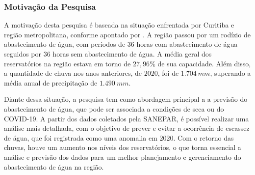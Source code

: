       
\subsubsection{Motiva\c c\~ao da Pesquisa} \label{subsubsec:motivacao}
 
 
A motivação desta pesquisa é baseada na situação enfrentada por Curitiba e região metropolitana, conforme apontado por . A região passou por um rodízio de abastecimento de água, com períodos de 36 horas com abastecimento de água seguidos por 36 horas sem abastecimento de água. A média geral dos reservatórios na região estava em torno de $27,96\%$ de sua capacidade. Além disso, a quantidade de chuva nos anos anteriores, de $2020$, foi de $1.704 \ mm$, superando a média anual de precipitação de $1.490 \ mm$.
 	
Diante dessa situação, a pesquisa tem como abordagem principal a a previsão do abastecimento de água, que pode ser associada a condições de seca ou do COVID-19. A partir dos dados coletados pela SANEPAR, é possível realizar uma análise mais detalhada, com o objetivo de prever e evitar a ocorrência de escassez de água, que foi registrada como uma anomalia em $2020$. Com o retorno das chuvas, houve um aumento nos níveis dos reservatórios, o que torna essencial a análise e previsão dos dados para um melhor planejamento e gerenciamento do abastecimento de água na região.
    
     
    